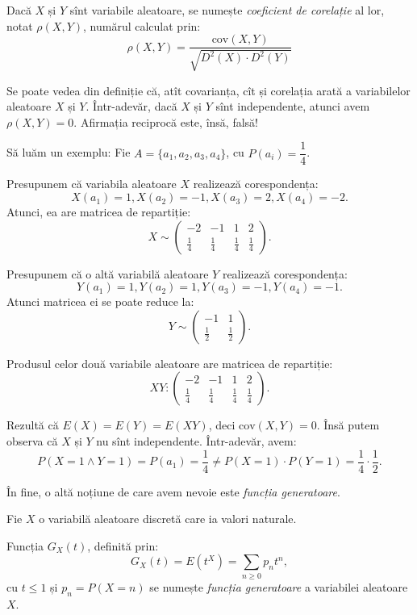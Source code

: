 \begin{definition}\label{def:cor}
  Dacă $ X $ și $ Y $ sînt variabile aleatoare, se numește \emph{coeficient de corelație}
  al lor, notat $ \rho(X, Y) $, numărul calculat prin:
  \[
    \rho(X, Y) = \frac{\mathrm{cov}(X, Y)}{\sqrt{D^2(X) \cdot D^2(Y)}}
  \]
\end{definition}

Se poate vedea din definiție că, atît covarianța, cît și corelația arată  a variabilelor aleatoare $ X $ și $ Y $. Într-adevăr, dacă $ X $ și $ Y $
sînt independente, atunci avem $ \rho(X, Y) = 0 $. Afirmația reciprocă este, însă, falsă!

Să luăm un exemplu: Fie $ A = \{ a_1, a_2, a_3, a_4 \}$, cu $ P(a_i) = \dfrac{1}{4} $.

Presupunem că variabila aleatoare $ X $ realizează corespondența:
\[
  X(a_1) = 1, X(a_2) = -1, X(a_3) = 2, X(a_4) = -2.
\]
Atunci, ea are matricea de repartiție:
\[
  X \sim
  \begin{pmatrix}
    -2 & -1 & 1 & 2 \\
    \frac{1}{4} & \frac{1}{4} & \frac{1}{4} & \frac{1}{4}
  \end{pmatrix}.
\]

Presupunem că o altă variabilă aleatoare $ Y $ realizează corespondența:
\[
  Y(a_1) = 1, Y(a_2) = 1, Y(a_3) = -1, Y(a_4) = -1.
\]
Atunci matricea ei se poate reduce la:
\[
  Y \sim
  \begin{pmatrix}
    -1 & 1 \\
    \frac{1}{2} & \frac{1}{2}
  \end{pmatrix}.
\]

Produsul celor două variabile aleatoare are matricea de repartiție:
\[
  XY :
  \begin{pmatrix}
    -2 & -1 & 1 & 2 \\
    \frac{1}{4} & \frac{1}{4} & \frac{1}{4} & \frac{1}{4}
  \end{pmatrix}.
\]

Rezultă că $ E(X) = E(Y) = E(XY) $, deci $ \mathrm{cov}(X, Y) = 0 $. Însă putem
observa că $ X $ și $ Y $ nu sînt independente. Într-adevăr, avem:
\[
  P(X = 1 \land Y = 1) = P(a_1) = \frac{1}{4} \neq %
  P(X = 1) \cdot P(Y = 1) = \frac{1}{4} \cdot \frac{1}{2}.
\]

În fine, o altă noțiune de care avem nevoie este \emph{funcția generatoare}.

\begin{definition}\label{def:generatoare}
  Fie $ X $ o variabilă aleatoare discretă care ia valori naturale.

  Funcția $ G_X(t) $, definită prin:
  \[
    G_X(t) = E(t^X) = \sum_{n \geq 0} p_n t^n, 
  \]
  cu $ t \leq 1 $ și $ p_n = P(X = n) $ se numește \emph{funcția generatoare}
  a variabilei aleatoare $ X $.
\end{definition}

